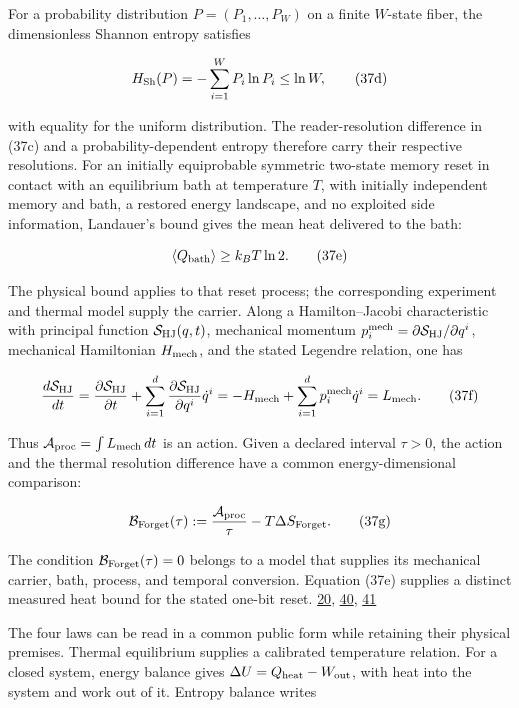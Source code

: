 For a probability distribution \(P=(P_1,\ldots,P_W)\) on a finite \(W\)-state fiber, the dimensionless Shannon entropy satisfies

\[
H_{\rm Sh}(P)=-\sum_{i=1}^{W}P_i\ln P_i\leq\ln W,
\tag{37d}
\]

with equality for the uniform distribution. The reader-resolution difference in (37c) and a probability-dependent entropy therefore carry their respective resolutions. For an initially equiprobable symmetric two-state memory reset in contact with an equilibrium bath at temperature \(T\), with initially independent memory and bath, a restored energy landscape, and no exploited side information, Landauer's bound gives the mean heat delivered to the bath:

\[
\langle Q_{\rm bath}\rangle\geq k_BT\ln2.
\tag{37e}
\]

The physical bound applies to that reset process; the corresponding experiment and thermal model supply the carrier. Along a Hamilton--Jacobi characteristic with principal function \(\mathcal S_{\rm HJ}(q,t)\), mechanical momentum \(p_i^{\rm mech}=\partial\mathcal S_{\rm HJ}/\partial q^i\), mechanical Hamiltonian \(H_{\rm mech}\), and the stated Legendre relation, one has

\[
\frac{d\mathcal S_{\rm HJ}}{dt}
=\frac{\partial\mathcal S_{\rm HJ}}{\partial t}
+\sum_{i=1}^d\frac{\partial\mathcal S_{\rm HJ}}{\partial q^i}\dot q^i
=-H_{\rm mech}+\sum_{i=1}^dp_i^{\rm mech}\dot q^i
=L_{\rm mech}.
\tag{37f}
\]

Thus \(\mathcal A_{\rm proc}=\int L_{\rm mech}\,dt\) is an action. Given a declared interval \(\tau>0\), the action and the thermal resolution difference have a common energy-dimensional comparison:

\[
\mathcal B_{\rm Forget}(\tau)
:=\frac{\mathcal A_{\rm proc}}{\tau}
-T\Delta S_{\rm Forget}.
\tag{37g}
\]

The condition \(\mathcal B_{\rm Forget}(\tau)=0\) belongs to a model that supplies its mechanical carrier, bath, process, and temporal conversion. Equation (37e) supplies a distinct measured heat bound for the stated one-bit reset. \href{https://doi.org/10.1002/j.1538-7305.1948.tb01338.x}{20}, \href{https://doi.org/10.1147/RD.53.0183}{40}, \href{https://doi.org/10.1038/nature10872}{41}

The four laws can be read in a common public form while retaining their physical premises. Thermal equilibrium supplies a calibrated temperature relation. For a closed system, energy balance gives \(\Delta U=Q_{\rm heat}-W_{\rm out}\), with heat into the system and work out of it. Entropy balance writes

